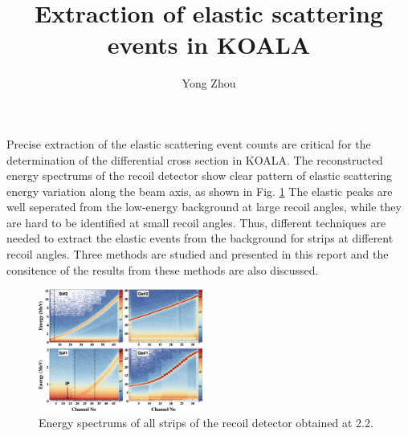 \documentclass[fleqn,twocolumn,a4paper]{ikpar}
\begin{document}
\parindent=0pt
\frenchspacing

\title{{\bf
    Extraction of elastic scattering events in KOALA
}}
\author{Yong Zhou
}

\maketitle

Precise extraction of the elastic scattering event counts are critical for the
determination of the differential cross section in KOALA.
The reconstructed energy spectrums of the recoil detector show clear pattern of
elastic scattering energy variation along the beam axis, as shown in Fig. \ref{fig:energy_vs_strips}
The elastic peaks are well seperated from the low-energy background at large
recoil angles, while they are hard to be identified at small recoil angles.
Thus, different techniques are needed to extract the elastic events from the
background for strips at different recoil angles.
Three methods are studied and presented in this report and the consitence of the results
from these methods are also discussed.
\begin{figure}[!htb]
	\includegraphics[width=0.48\textwidth]{./energy_vs_strips.png}
  \caption{Energy spectrums of all strips of the recoil detector obtained at \SI{2.2}{\momentum}.}
  \label{fig:energy_vs_strips}
\end{figure}

\par
\medskip
\end{document}
